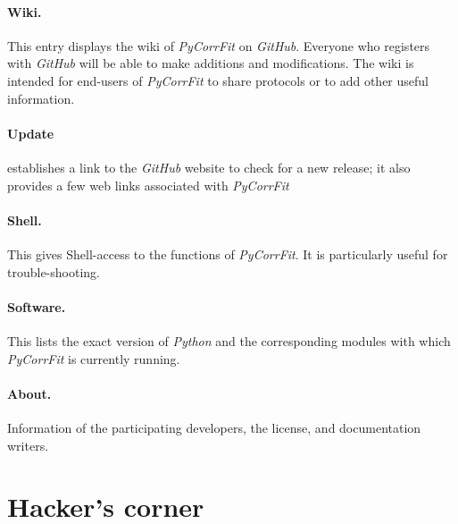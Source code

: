 \paragraph*{Wiki.}
This entry displays the wiki of \textit{PyCorrFit} on \textit{GitHub}. Everyone who registers with \textit{GitHub} will be able to make additions and modifications. The wiki is intended for end-users of \textit{PyCorrFit} to share protocols or to add other useful information.
\paragraph*{Update}
establishes a link to the \textit{GitHub} website to check for a new release; it also provides a few web links associated with \textit{PyCorrFit}
\paragraph*{Shell.}
This gives Shell-access to the functions of \textit{PyCorrFit}. It is particularly useful for trouble-shooting.
\paragraph*{Software.}
This lists the exact version of \textit{Python} and the corresponding modules with which \textit{PyCorrFit} is currently running.
\paragraph*{About.}
Information of the participating developers, the license, and documentation writers.


\section{Hacker's corner}
\label{sec:hacke}
